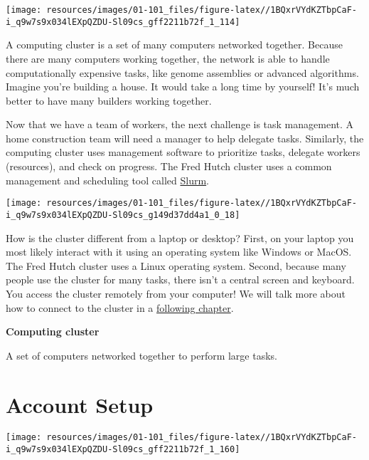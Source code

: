 \documentclass[
]{book}
\begin{document}
\begin{center}\texttt{[image: resources/images/01-101\_files/figure-latex//1BQxrVYdKZTbpCaF-i\_q9w7s9x034lEXpQZDU-Sl09cs\_gff2211b72f\_1\_114]} \end{center}

A computing cluster is a set of many computers networked together. Because there are many computers working together, the network is able to handle computationally expensive tasks, like genome assemblies or advanced algorithms. Imagine you're building a house. It would take a long time by yourself! It's much better to have many builders working together.

Now that we have a team of workers, the next challenge is task management. A home construction team will need a manager to help delegate tasks. Similarly, the computing cluster uses management software to prioritize tasks, delegate workers (resources), and check on progress. The Fred Hutch cluster uses a common management and scheduling tool called \href{https://slurm.schedmd.com/overview.html}{Slurm}.

\begin{center}\texttt{[image: resources/images/01-101\_files/figure-latex//1BQxrVYdKZTbpCaF-i\_q9w7s9x034lEXpQZDU-Sl09cs\_g149d37dd4a1\_0\_18]} \end{center}

How is the cluster different from a laptop or desktop? First, on your laptop you most likely interact with it using an operating system like Windows or MacOS. The Fred Hutch cluster uses a Linux operating system. Second, because many people use the cluster for many tasks, there isn't a central screen and keyboard. You access the cluster remotely from your computer! We will talk more about how to connect to the cluster in a \protect\hyperlink{terminal}{following chapter}.

\textbf{Computing cluster}

A set of computers networked together to perform large tasks.

\hypertarget{account-setup}{%
\chapter{Account Setup}\label{account-setup}}

\begin{center}\texttt{[image: resources/images/01-101\_files/figure-latex//1BQxrVYdKZTbpCaF-i\_q9w7s9x034lEXpQZDU-Sl09cs\_gff2211b72f\_1\_160]} \end{center}
\end{document}
